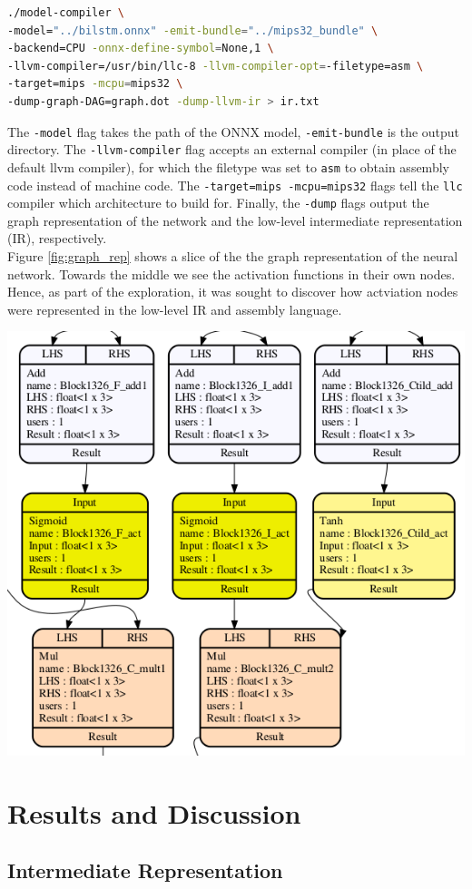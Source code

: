 \documentclass[twocolumn]{article}
\newcommand{\cc}[1]{\texttt{#1}}
\begin{document}
\begin{lstlisting}[language=bash]
./model-compiler \ 
-model="../bilstm.onnx" -emit-bundle="../mips32_bundle" \ 
-backend=CPU -onnx-define-symbol=None,1 \ 
-llvm-compiler=/usr/bin/llc-8 -llvm-compiler-opt=-filetype=asm \
-target=mips -mcpu=mips32 \
-dump-graph-DAG=graph.dot -dump-llvm-ir > ir.txt
\end{lstlisting}
\medskip
 The \cc{-model} flag takes the path of the ONNX model, \cc{-emit-bundle} is the output directory. The \cc{-llvm-compiler} flag accepts an external compiler (in place of the default llvm compiler), for which the filetype was set to \cc{asm} to obtain assembly code instead of machine code. The \cc{-target=mips -mcpu=mips32} flags tell the \cc{llc} compiler which architecture to build for. Finally, the \cc{-dump} flags output the graph representation of the network and the low-level intermediate representation (IR), respectively. \\
 
 Figure \ref{fig:graph_rep} shows a slice of the the graph representation of the neural network. Towards the middle we see the activation functions in their own nodes. Hence, as part of the exploration, it was sought to discover how actviation nodes were represented in the low-level IR and assembly language. 

 \begingroup
    \centering
    \medskip
    \includegraphics[width=0.5\columnwidth]{Lab-Tex/final/graph.png}
    \label{fig:graph_rep}
    \medskip
\endgroup

 \section{Results and Discussion}
 
 \subsection{Intermediate Representation}
 
\end{document}
